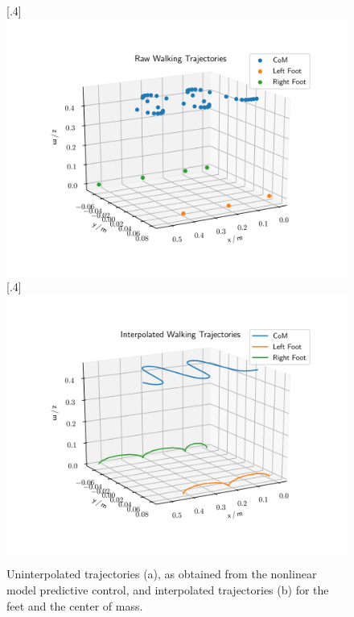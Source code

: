 \begin{figure}[h!]
	\centering
	\subcaptionbox{}%
	[.4\linewidth]{\includegraphics[scale=.4]{chapters/02_foundations_for_humanoid_walking/img/raw_results.png}}
	\subcaptionbox{}%
	[.4\linewidth]{\includegraphics[scale=.4]{chapters/02_foundations_for_humanoid_walking/img/interpolated_results.png}}
	\caption{Uninterpolated trajectories (a), as obtained from the nonlinear model predictive control, and interpolated trajectories (b) for the feet and the center of mass.}
	\label{fig::23_ip}
\end{figure}
\FloatBarrier
